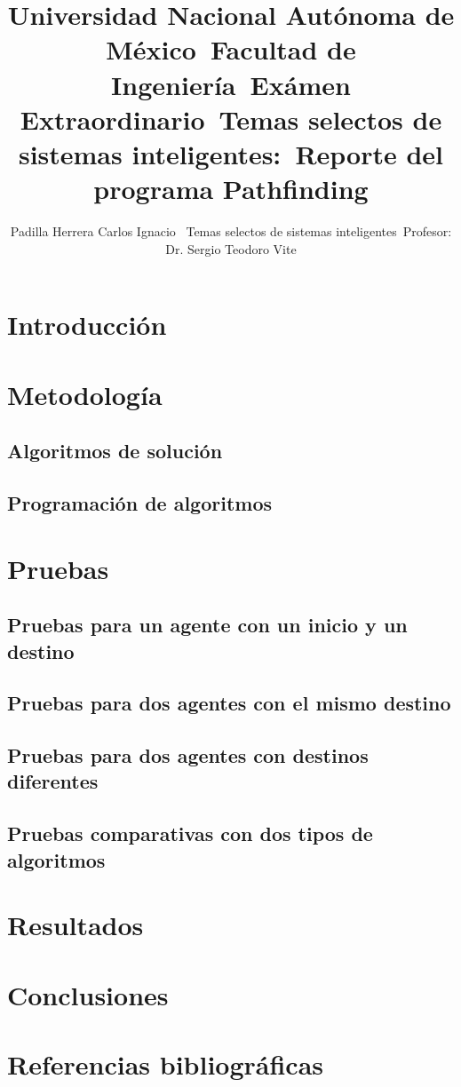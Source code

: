 \documentclass[12pt,a4paper]{article}
\title{Universidad Nacional Autónoma de México\
Facultad de Ingeniería\
Exámen Extraordinario\
Temas selectos de sistemas inteligentes:\
Reporte del programa Pathfinding}
\author{Padilla Herrera Carlos Ignacio \
Temas selectos de sistemas inteligentes\
Profesor: Dr. Sergio Teodoro Vite}
\begin{document}
\maketitle
\tableofcontents

\section{Introducción}

\section{Metodología}
\subsection{Algoritmos de solución}
\subsection{Programación de algoritmos}

\section{Pruebas}
\subsection{Pruebas para un agente con un inicio y un destino}
\subsection{Pruebas para dos agentes con el mismo destino}
\subsection{Pruebas para dos agentes con destinos diferentes}
\subsection{Pruebas comparativas con dos tipos de algoritmos}

\section{Resultados}

\section{Conclusiones}

\section{Referencias bibliográficas}
\end{document}
